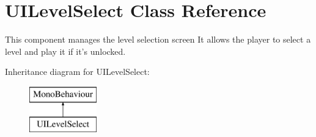 \hypertarget{class_u_i_level_select}{\section{U\+I\+Level\+Select Class Reference}
\label{class_u_i_level_select}
}


This component manages the level selection screen It allows the player to select a level and play it if it's unlocked.  


Inheritance diagram for U\+I\+Level\+Select\+:\begin{figure}[H]
\begin{center}
\leavevmode
\includegraphics[height=2.000000cm]{class_u_i_level_select}
\end{center}
\end{figure}
